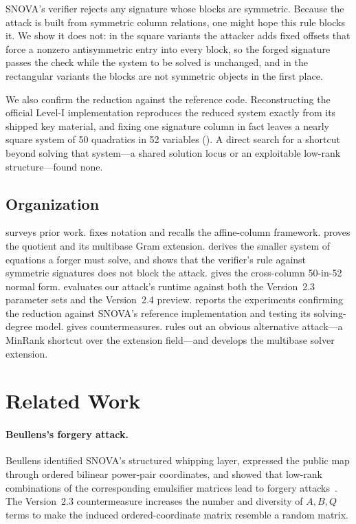 \documentclass[11pt]{article}
\newcommand{\SNOVA}{\textsf{SNOVA}}
\begin{document}
\SNOVA{}'s verifier rejects any signature whose blocks are symmetric.  Because the attack is built from symmetric column relations, one might hope this rule blocks it.  We show it does not: in the square variants the attacker adds fixed offsets that force a nonzero antisymmetric entry into every block, so the forged signature passes the check while the system to be solved is unchanged, and in the rectangular variants the blocks are not symmetric objects in the first place.

We also confirm the reduction against the reference code.  Reconstructing the official Level-I implementation reproduces the reduced system exactly from its shipped key material, and fixing one signature column in fact leaves a nearly square system of 50 quadratics in 52 variables ().  A direct search for a shortcut beyond solving that system---a shared solution locus or an exploitable low-rank structure---found none.

\subsection{Organization}

 surveys prior work.   fixes notation and recalls the affine-column framework.   proves the quotient and its multibase Gram extension.   derives the smaller system of equations a forger must solve, and  shows that the verifier's rule against symmetric signatures does not block the attack.   gives the cross-column 50-in-52 normal form.   evaluates our attack's runtime against both the Version~2.3 parameter sets and the Version~2.4 preview.   reports the experiments confirming the reduction against \SNOVA{}'s reference implementation and testing its solving-degree model.   gives countermeasures.   rules out an obvious alternative attack---a MinRank shortcut over the extension field---and  develops the multibase solver extension.

\section{Related Work}\label{sec:related}

\paragraph{Beullens's forgery attack.}
Beullens identified \SNOVA{}'s structured whipping layer, expressed the public map through ordered bilinear power-pair coordinates, and showed that low-rank combinations of the corresponding emulsifier matrices lead to forgery attacks~\cite{Beullens2024SNOVA}.  The Version~2.3 countermeasure increases the number and diversity of $A,B,Q$ terms to make the induced ordered-coordinate matrix resemble a random matrix.
\end{document}
